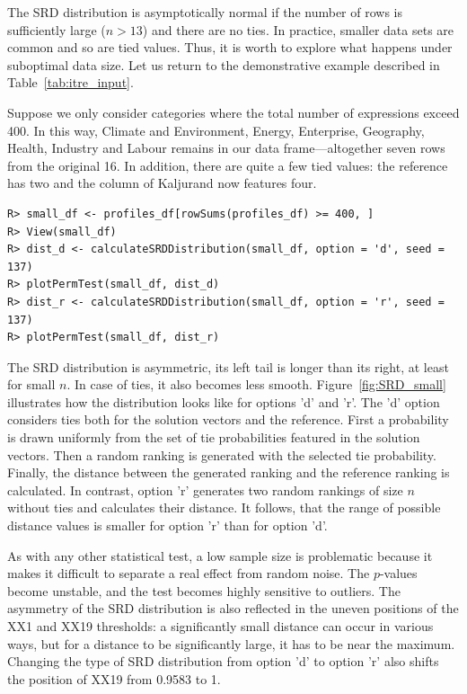 The SRD distribution is asymptotically normal if the number of rows is sufficiently large ($n>13$) and there are no ties. In practice, smaller data sets are common and so are tied values. Thus, it is worth to explore what happens under suboptimal data size. Let us return to the demonstrative example described in Table~\ref{tab:itre_input}.

Suppose we only consider categories where the total number of expressions exceed 400. In this way, Climate and Environment, Energy, Enterprise, Geography, Health, Industry and Labour remains in our data frame---altogether seven rows from the original 16. In addition, there are quite a few tied values: the reference has two and the column of Kaljurand now features four.

\begin{verbatim}
R> small_df <- profiles_df[rowSums(profiles_df) >= 400, ]
R> View(small_df)
R> dist_d <- calculateSRDDistribution(small_df, option = 'd', seed = 137)
R> plotPermTest(small_df, dist_d)
R> dist_r <- calculateSRDDistribution(small_df, option = 'r', seed = 137)
R> plotPermTest(small_df, dist_r)
\end{verbatim}

The SRD distribution is asymmetric, its left tail is longer than its right, at least for small $n$. In case of ties, it also becomes less smooth. Figure~\ref{fig:SRD_small} illustrates how the distribution looks like for options 'd' and 'r'. The 'd' option considers ties both for the solution vectors and the reference. First a probability is drawn uniformly from the set of tie probabilities featured in the solution vectors. Then a random ranking is generated with the selected tie probability. Finally, the distance between the generated ranking and the reference ranking is calculated. In contrast, option 'r' generates two random rankings of size $n$ without ties and calculates their distance. It follows, that the range of possible distance values is smaller for option 'r' than for option 'd'.

As with any other statistical test, a low sample size is problematic because it makes it difficult to separate a real effect from random noise. The $p$-values become unstable, and the test becomes highly sensitive to outliers. The asymmetry of the SRD distribution is also reflected in the uneven positions of the XX1 and XX19 thresholds: a significantly small distance can occur in various ways, but for a distance to be significantly large, it has to be near the maximum. Changing the type of SRD distribution from option 'd' to option 'r' also shifts the position of XX19 from 0.9583 to 1.

